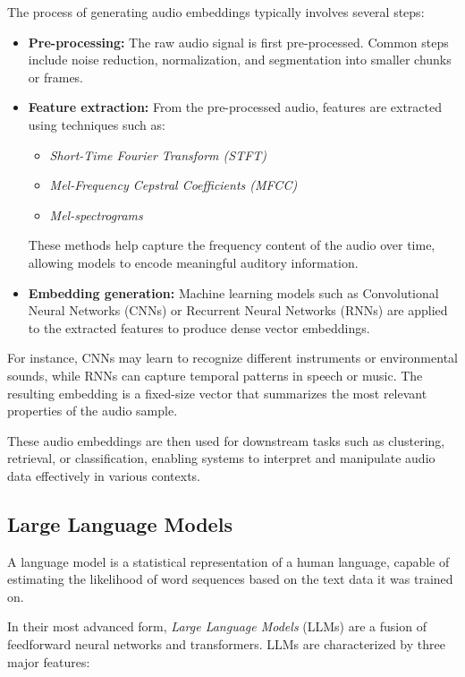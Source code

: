 The process of generating audio embeddings typically involves several steps:

\begin{itemize}
    \item \textbf{Pre-processing:} The raw audio signal is first pre-processed. Common steps include noise reduction, normalization, and segmentation into smaller chunks or frames.
    
    \item \textbf{Feature extraction:} From the pre-processed audio, features are extracted using techniques such as:
    \begin{itemize}
        \item \textit{Short-Time Fourier Transform (STFT)}
        \item \textit{Mel-Frequency Cepstral Coefficients (MFCC)}
        \item \textit{Mel-spectrograms}
    \end{itemize}
    These methods help capture the frequency content of the audio over time, allowing models to encode meaningful auditory information.
    
    \item \textbf{Embedding generation:} Machine learning models such as Convolutional Neural Networks (CNNs) or Recurrent Neural Networks (RNNs) are applied to the extracted features to produce dense vector embeddings. 
\end{itemize}

For instance, CNNs may learn to recognize different instruments or environmental sounds, while RNNs can capture temporal patterns in speech or music. The resulting embedding is a fixed-size vector that summarizes the most relevant properties of the audio sample.

These audio embeddings are then used for downstream tasks such as clustering, retrieval, or classification, enabling systems to interpret and manipulate audio data effectively in various contexts.

\subsection*{Large Language Models}
\label{sssec:llms}

A language model is a statistical representation of a human language, capable of estimating the likelihood of word sequences based on the text data it was trained on.

In their most advanced form, \textit{Large Language Models} (LLMs) are a fusion of feedforward neural networks and transformers. LLMs are characterized by three major features:

